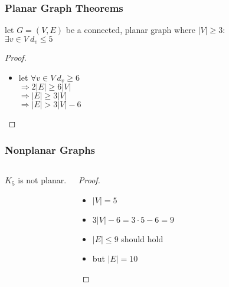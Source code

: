 \documentclass[dvipsnames]{beamer}
\begin{document}
\begin{frame}
  \frametitle{Planar Graph Theorems}

  \begin{theorem}
    let $G=(V,E)$ be a connected, planar graph where $|V| \geq 3$:\\
    $\exists v \in V~d_v \leq 5$
  \end{theorem}

  \pause
  \begin{proof}
    \begin{itemize}
      \item let $\forall v \in V~d_v \geq 6$\\
        \pause
        $\Rightarrow 2 |E| \geq 6 |V|$\\
        \pause
        $\Rightarrow |E| \geq 3 |V|$\\
        \pause
        $\Rightarrow |E| > 3 |V| - 6$
    \end{itemize}
  \end{proof}
\end{frame}

\begin{frame}
  \frametitle{Nonplanar Graphs}

  \begin{columns}
    \begin{theorem}
      $K_5$ is not planar.

      \medskip
      \begin{center}
      \end{center}
    \end{theorem}

    \pause
    \begin{proof}
      \begin{itemize}
        \item $|V| = 5$

        \pause
        \item $3 |V| - 6 = 3 \cdot 5 - 6 = 9$

        \pause
        \item $|E| \leq 9$ should hold

        \pause
        \item but $|E| = 10$
      \end{itemize}
    \end{proof}
  \end{columns}
\end{frame}
\end{document}
